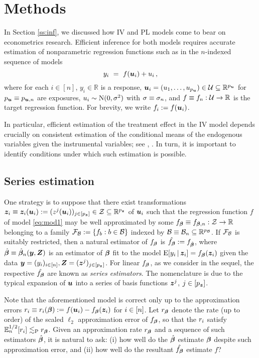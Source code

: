 \documentclass{uwstat572}
\newcommand{\be}{\begin{equation}}
\newcommand{\ee}{\end{equation}}
\theoremstyle{definition}
\theoremstyle{remark}
\newcommand{\R}{\ensuremath{\mathbb{R}}}
\newcommand{\Prb}{\mathrm{P}}
\newcommand{\E}{\mathrm{E}}
\newcommand{\Ex}{\mathbb{E}}
\newcommand{\Exn}{\Ex_n}
\newcommand{\Normal}{\mathrm{N}}
\numberwithin{equation}{section}
\begin{document}
\section{Methods}\label{s:methods}

In Section \ref{ss:inf}, we discussed how IV and PL models come to bear on econometrics research. Efficient inference for both models requires accurate estimation of nonparametric regression functions such as in the $n$-indexed sequence of models
\be\label{eq:mod1}
	y_i \ = \ f(\u_i) + \esi\,,
\ee
where for each $i\in[n]$, $y_i \in \R$ is a response, $\u_i = (u_1,\ldots,u_{\pu}) \in \Us \subseteq \R^{\pu}$ for $p_{\boldsymbol{u}} \equiv p_{\boldsymbol{u},n}$ are exposures, $\esi \sim \Normal(0,\sd^2)$ with $\sigma \equiv \sigma_n$, and $f \equiv f_n : \Us \to \R$ is the target regression function. For brevity, we write $f_i := f(\boldsymbol{u}_i)$. 

In particular, efficient estimation of the treatment effect in the IV model depends crucially on consistent estimation of the conditional means of the endogenous variables given the instrumental variables; see \cite{A74}, \cite{N90}. In turn, it is important to identify conditions under which such estimation is possible. 




%
% 
\subsection{Series estimation}\label{ss:se}

One strategy is to suppose that there exist transformations $\z_i \equiv \z_i(\u_i) := (z^j(\u_i))_{j\in[\pz]} \in \Zs \subseteq \R^{\pz}$ of $\boldsymbol{u}_i$ such that the regression function $f$ of model \eqref{eq:mod1} may be well approximated by some $\fb \equiv \fbn : \Zs \to \R$ belonging to a family $\mathcal{F}_{\mathcal{B}} := \{ f_b:b\in\mathcal{B}\}$ indexed by $\Bs \equiv \Bs_n \subseteq \R^{p_\Bs}$. If $\mathcal{F}_{\mathcal{B}}$ is suitably restricted, then a natural estimator of $f_{\boldsymbol{\beta}}$ is $\hat{f_{\boldsymbol{\beta}}} := f_{\hat{\boldsymbol{\beta}}}$, where $\hat{\boldsymbol{\beta}} \equiv \hat{\boldsymbol{\beta}}_n(\boldsymbol{y}, \boldsymbol{Z})$ is an estimator of $\boldsymbol{\beta}$ fit to the model $\E[y_i\,|\,\z_i] = \fb(\z_i)$ given the data $\boldsymbol{y} = (y_i)_{i\in[n]}, \boldsymbol{Z} = (\boldsymbol{z}^j)_{j\in[{p_{\boldsymbol{z}}}]}$. For linear $f_{\boldsymbol{\beta}}$, as we consider in the sequel, the respective $\hat{f_{\boldsymbol{\beta}}}$ are known as \emph{series estimators}. The nomenclature is due to the typical expansion of $\boldsymbol{u}$ into a series of basis functions $\boldsymbol{z}^j$, $j\in[{p_{\boldsymbol{z}}}]$. 

Note that the aforementioned model is correct only up to the approximation errors $r_i \equiv r_i(\boldsymbol{\beta}) := f(\boldsymbol{u}_i) - f_{\boldsymbol{\beta}}(\boldsymbol{z}_i)$ for $i\in[n]$. Let $r_{\boldsymbol{\beta}}$ denote the rate (up to order) of the scaled $\ell_2$ approximation error of $f_{\boldsymbol{\beta}}$, so that the $r_i$ satisfy $\Exn^{1/2}[r_i] \lesssim_\Prb \rb$. Given an approximation rate $r_{\boldsymbol{\beta}}$ and a sequence of such estimators $\hat{\boldsymbol{\beta}}$, it is natural to ask: (i) how well do the $\hat{\boldsymbol{\beta}}$ estimate $\boldsymbol{\beta}$ despite such approximation error, and (ii) how well do the resultant $\hat{f_{\boldsymbol{\beta}}}$ estimate $f$? 
\end{document}

